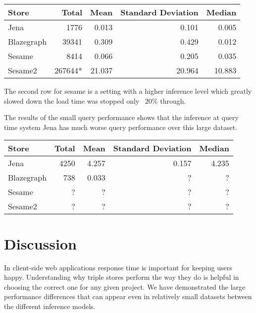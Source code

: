 \documentclass{llncs}
\begin{document}
\begin{tabular}{l | r r r r } Store & Total & Mean & Standard Deviation & Median \\ \hline Jena & 1776 & 0.013 & 0.101 & 0.005 \\ Blazegraph & 39341 & 0.309 & 0.429 & 0.012 \\ Sesame & 8414 & 0.066 & 0.205 & 0.035 \\ Sesame2 & 267644* & 21.037 & 20.964 & 10.883 \end{tabular}

The second row for sesame is a setting with a higher inference level which greatly slowed down the load time was stopped only ~20\% through.

The results of the small query performance shows that the inference at query time system Jena has much worse query performance over this large dataset.

\begin{tabular}{l | r r r r } Store & Total & Mean & Standard Deviation & Median \\ \hline Jena & 4250 & 4.257 & 0.157 & 4.235 \\ Blazegraph & 738 & 0.033 & ? & ? \\ Sesame & ? & ? & ? & ? \\ Sesame2 & ? & ? & ? & ? \end{tabular}


\section{Discussion}
In client-side web applications response time is important for keeping users happy.  Understanding why triple stores perform the way they do is helpful in choosing the correct one for any given project.  We have demonstrated the large performance differences that can appear even in relatively small datasets between the different inference models.



\end{document}
